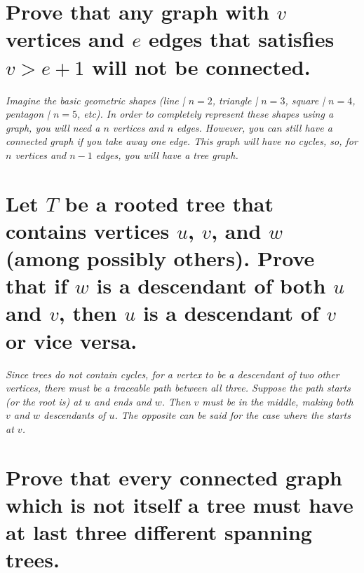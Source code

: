 \documentclass{article}
\begin{document}

\section{Prove that any graph with $v$ vertices and $e$ edges that satisfies $v>e+1$ will not be connected.}
\hspace{1cm}\textit{Imagine the basic geometric shapes (line | $n=2$, triangle | $n=3$, square | $n=4$, pentagon | $n=5$, etc). In order to completely represent these shapes using a graph, you will need a $n$ vertices and $n$ edges. However, you can still have a connected graph if you take away one edge. This graph will have no cycles, so, for $n$ vertices and $n-1$ edges, you will have a tree graph.}


\section{Let $T$ be a rooted tree that contains vertices $u$, $v$, and $w$ (among possibly others). Prove that if $w$ is a descendant of both $u$ and $v$, then $u$ is a descendant of $v$ or vice versa.}
\hspace{1cm}\textit{Since trees do not contain cycles, for a vertex to be a descendant of two other vertices, there must be a traceable path between all three. Suppose the path starts (or the root is) at $u$ and ends and $w$. Then $v$ must be in the middle, making both $v$ and $w$ descendants of $u$. The opposite can be said for the case where the starts at $v$.}


\section{Prove that every connected graph which is not itself a tree must have at last three different spanning trees.}
\end{document}
